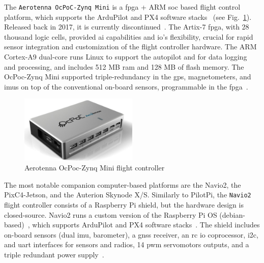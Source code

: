 The \lstinline{Aerotenna OcPoC-Zynq Mini} is a \gls{fpga} + ARM \gls{soc} based
  flight control platform,  which supports the ArduPilot and PX4 software
  stacks~\cite{ocpoc} (see Fig.~\ref{fig:hw-ocpoc}). Released back in 2017, it
  is currently discontinued~\cite{ocpoc-discontinued}.
  The Artix-7 \gls{fpga}, with 28 thousand logic cells, provided \gls{ai}
  capabilities and \gls{io}'s flexibility, crucial for rapid sensor integration
  and customization of the flight controller hardware. The ARM Cortex-A9
  dual-core runs Linux to support the autopilot and for data logging and
  processing, and includes 512 MB \gls{ram} and 128 MB of flash memory. The OcPoc-Zynq Mini supported
  triple-redundancy in the \gls{gps}, magnetometers, and \glspl{imu} on top of
  the conventional on-board sensors, programmable in the
  \gls{fpga}~\cite{ocpoc}.

\begin{figure}[!hbt]
  \centering
  \includegraphics[width=0.5\textwidth]{./img/png/hw-ocpoc-zynq-mini.png} 
  \caption[Aerotenna OcPoc-Zynq Mini flight controller]{Aerotenna OcPoc-Zynq Mini flight controller~\cite{ocpoc}\footnotemark}%
  \label{fig:hw-ocpoc}
\end{figure}
%
%

The most notable companion computer-based platforms are the Navio2,
the PixC4-Jetson, and the Auterion Skynode X/S.  
Similarly to PilotPi, the \lstinline{Navio2} flight controller consists of a
Raspberry Pi shield, but the hardware design is closed-source.
Navio2 runs a custom version of the Raspberry Pi OS (debian-based)~\cite{navio2-sw}, which supports ArduPilot and PX4 software
stacks~\cite{arduPilot-Navio2,navio2-px4}.
  The shield includes on-board
  sensors (dual \gls{imu}, barometer), a \gls{gnss} receiver, an \gls{rc}
  \gls{io} coprocessor, \gls{i2c}, and
  \gls{uart} interfaces for sensors and radios, 14 \gls{pwm} servomotors
  outputs, and a triple redundant power supply~\cite{arduPilot-Navio2}.

